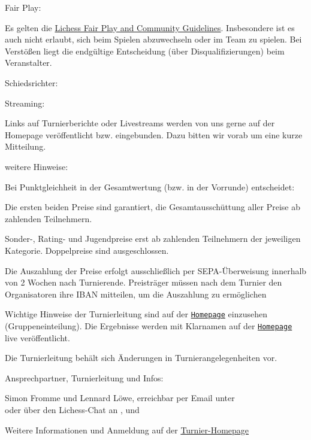 \documentclass[paper=a4, fontsize=10pt]{scrartcl}
\begin{document}
\begin{basedescript}{\desclabelstyle{\multilinelabel}\desclabelwidth{10em}}
\item[Fair Play:]

  Es gelten die \href{\lichessTermsOfServiceURL}{Lichess Fair Play and
    Community Guidelines}. Insbesondere ist es auch nicht erlaubt,
  sich beim Spielen abzuwechseln oder im Team zu spielen. Bei
  Verstößen liegt die endgültige Entscheidung (über
  Disqualifizierungen) beim Veranstalter.

\item[Schiedsrichter:]

  \arbiter{}

\item[Streaming:]

  Links auf Turnierberichte oder Livestreams werden von uns gerne auf
  der Homepage veröffentlicht bzw. eingebunden. Dazu bitten wir vorab
  um eine kurze Mitteilung.

\item[weitere Hinweise:]

  Bei Punktgleichheit in der Gesamtwertung (bzw. in der Vorrunde)
  entscheidet:

  \enum{\tiebreak}

  Die ersten beiden Preise sind garantiert, die Gesamtausschüttung
  aller Preise ab \prizesGuaranteedMinParaticipants{} zahlenden
  Teilnehmern.

  Sonder-, Rating- und Jugendpreise erst ab
  \specialPrizesGuaranteedMinParaticipants{} zahlenden Teilnehmern der
  jeweiligen Kategorie. Doppelpreise sind ausgeschlossen.

  Die Auszahlung der Preise erfolgt ausschließlich per
  SEPA-Überweisung innerhalb von 2 Wochen nach
  Turnierende. Preisträger müssen nach dem Turnier den Organisatoren
  ihre IBAN mitteilen, um die Auszahlung zu ermöglichen
  
  Wichtige Hinweise der Turnierleitung sind auf der
  \href{\tournamentURL}{\texttt{Homepage}} einzusehen
  (Gruppeneinteilung). Die Ergebnisse werden mit Klarnamen auf der
  \href{\tournamentURL}{\texttt{Homepage}} live veröffentlicht.

  Die Turnierleitung behält sich Änderungen in Turnierangelegenheiten
  vor.

\item[Ansprechpartner, Turnierleitung und Infos:]

  Simon Fromme und Lennard Löwe, erreichbar per Email unter
  \\ \email{\tournamentEmail} oder über den Lichess-Chat an
  ,  und

  Weitere Informationen und Anmeldung auf der
  \href{\tournamentURL}{Turnier-Homepage}
\end{basedescript}
\end{document}
